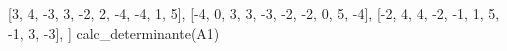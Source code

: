 \documentclass[
  letterpaper,
  DIV=11,
  numbers=noendperiod]{scrartcl}
\newenvironment{Shaded}{\begin{snugshade}}{\end{snugshade}}
\newcommand{\DecValTok}[1]{\textcolor[rgb]{0.68,0.00,0.00}{#1}}
\newcommand{\NormalTok}[1]{\textcolor[rgb]{0.00,0.23,0.31}{#1}}
\newcommand{\OperatorTok}[1]{\textcolor[rgb]{0.37,0.37,0.37}{#1}}
\begin{document}
\begin{Shaded}
\begin{Highlighting}[]
\NormalTok{    [}\DecValTok{3}\NormalTok{, }\DecValTok{4}\NormalTok{, }\OperatorTok{{-}}\DecValTok{3}\NormalTok{, }\DecValTok{3}\NormalTok{, }\OperatorTok{{-}}\DecValTok{2}\NormalTok{, }\DecValTok{2}\NormalTok{, }\OperatorTok{{-}}\DecValTok{4}\NormalTok{, }\OperatorTok{{-}}\DecValTok{4}\NormalTok{, }\DecValTok{1}\NormalTok{, }\DecValTok{5}\NormalTok{],}
\NormalTok{    [}\OperatorTok{{-}}\DecValTok{4}\NormalTok{, }\DecValTok{0}\NormalTok{, }\DecValTok{3}\NormalTok{, }\DecValTok{3}\NormalTok{, }\OperatorTok{{-}}\DecValTok{3}\NormalTok{, }\OperatorTok{{-}}\DecValTok{2}\NormalTok{, }\OperatorTok{{-}}\DecValTok{2}\NormalTok{, }\DecValTok{0}\NormalTok{, }\DecValTok{5}\NormalTok{, }\OperatorTok{{-}}\DecValTok{4}\NormalTok{],}
\NormalTok{    [}\OperatorTok{{-}}\DecValTok{2}\NormalTok{, }\DecValTok{4}\NormalTok{, }\DecValTok{4}\NormalTok{, }\OperatorTok{{-}}\DecValTok{2}\NormalTok{, }\OperatorTok{{-}}\DecValTok{1}\NormalTok{, }\DecValTok{1}\NormalTok{, }\DecValTok{5}\NormalTok{, }\OperatorTok{{-}}\DecValTok{1}\NormalTok{, }\DecValTok{3}\NormalTok{, }\OperatorTok{{-}}\DecValTok{3}\NormalTok{],}
\NormalTok{]}
\NormalTok{calc\_determinante(A1)}
\end{Highlighting}
\end{Shaded}
\end{document}
